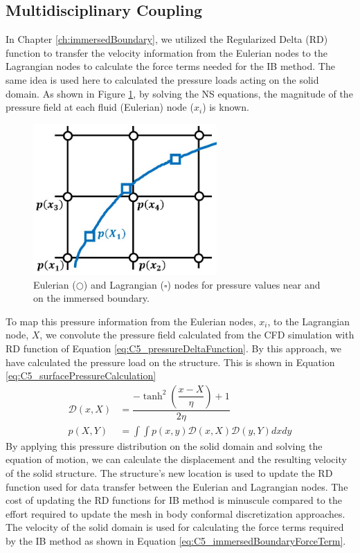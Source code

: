 \subsection{Multidisciplinary Coupling}
In Chapter \ref{ch:immersedBoundary}, we utilized the Regularized Delta (RD) function to transfer the velocity information from the Eulerian nodes to the Lagrangian nodes to calculate the force terms needed for the IB method. The same idea is used here to calculated the pressure loads acting on the solid domain. As shown in Figure \ref{fig:C5_pressureMapping}, by solving the NS equations, the magnitude of the pressure field at each fluid (Eulerian) node ($x_i$) is known.
%
\begin{figure}[H]
    \centering
    \includegraphics[width=7.00cm]{Chapter_5/figure/Chapter5_pressureMapping.jpg}
    \caption{Eulerian ($\bigcirc$) and Lagrangian ($\square$) nodes for pressure values near and on the immersed boundary.}
    \label{fig:C5_pressureMapping}
\end{figure}
%
To map this pressure information from the Eulerian nodes, $x_i$, to the Lagrangian node, $X$, we convolute the pressure field calculated from the CFD simulation with RD function of Equation \eqref{eq:C5_pressureDeltaFunction}.  By this approach, we have calculated the pressure load on the structure. This is shown in Equation \eqref{eq:C5_surfacePressureCalculation}
%
\begin{subequations}
\begin{align}
    \mathcal{D}(x, X) &=
    \dfrac{-\tanh^{2}{\left (\dfrac{x - X}{\eta} \right )} + 1}{2 \eta}
    \label{eq:C5_pressureDeltaFunction}
    \\
    p(X, Y) &= \int \int p(x,y) \mathcal{D}(x, X) \mathcal{D}(y, Y) dx dy
    \label{eq:C5_surfacePressureCalculation}
\end{align}
\end{subequations}
%
By applying this pressure distribution on the solid domain and solving the equation of motion, we can calculate the displacement and the resulting velocity of the solid structure. The structure's new location is used to update the RD function used for data transfer between the Eulerian and Lagrangian nodes. The cost of updating the RD functions for IB method is minuscule compared to the effort required to update the mesh in body conformal discretization approaches. The velocity of the solid domain is used for calculating the force terms required by the IB method as shown in Equation \eqref{eq:C5_immersedBoundaryForceTerm}.
